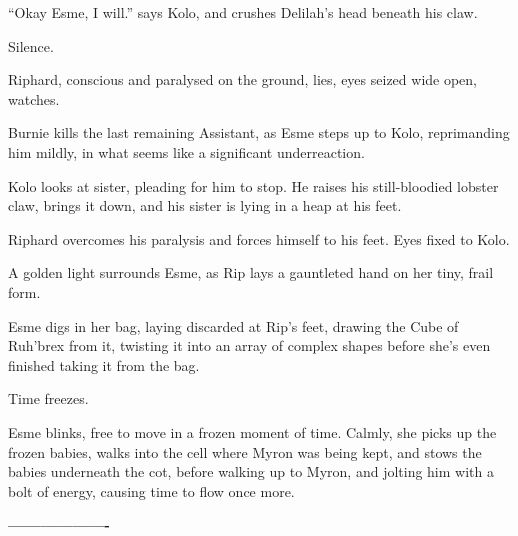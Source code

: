 “Okay Esme, I will.” says Kolo, and crushes Delilah’s head beneath his claw.\medskip

Silence.\medskip

Riphard, conscious and paralysed on the ground, lies, eyes seized wide open, watches.\medskip

Burnie kills the last remaining Assistant, as Esme steps up to Kolo, reprimanding him mildly, in what seems like a significant underreaction.\medskip

Kolo looks at sister, pleading for him to stop. He raises his still-bloodied lobster claw, brings it down, and his sister is lying in a heap at his feet.\medskip

Riphard overcomes his paralysis and forces himself to his feet. Eyes fixed to Kolo.\medskip

A golden light surrounds Esme, as Rip lays a gauntleted hand on her tiny, frail form.\medskip

Esme digs in her bag, laying discarded at Rip’s feet, drawing the Cube of Ruh’brex from it, twisting it into an array of complex shapes before she’s even finished taking it from the bag.\medskip

Time freezes.\medskip

Esme blinks, free to move in a frozen moment of time. Calmly, she picks up the frozen babies, walks into the cell where Myron was being kept, and stows the babies underneath the cot, before walking up to Myron, and jolting him with a bolt of energy, causing time to flow once more.\medskip

\textbf{-------------------}\medskip

\vspace*{5mm}

